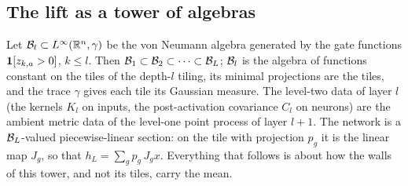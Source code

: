 \subsection{The lift as a tower of algebras}
Let $\mathcal B_l\subset L^\infty(\mathbb R^n,\gamma)$ be the von Neumann algebra generated by the gate functions
$\mathbf 1[z_{k,a}>0]$, $k\le l$. Then $\mathcal B_1\subset\mathcal B_2\subset\cdots\subset\mathcal B_L$; $\mathcal B_l$ is the algebra of functions
constant on the tiles of the depth-$l$ tiling, its minimal projections are the tiles, and the trace $\gamma$ gives
each tile its Gaussian measure. The level-two data of layer $l$ (the kernels $K_l$ on inputs, the post-activation
covariance $C_l$ on neurons) are the ambient metric data of the level-one point process of layer $l+1$. The network
is a $\mathcal B_L$-valued piecewise-linear section: on the tile with projection $p_g$ it is the linear map $J_g$, so that
$h_L=\sum_gp_g\,J_gx$. Everything that follows is about how the walls of this tower, and not its tiles, carry the
mean.
